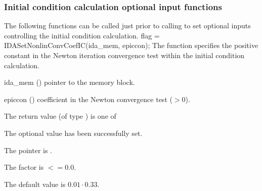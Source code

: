 {\subsubsection{Initial condition calculation optional input functions}\label{sss:optin_iccalc}
The following functions can be called just prior to calling 
to set optional inputs controlling the initial condition calculation.
{
flag = IDASetNonlinConvCoefIC(ida\_mem, epiccon);
}
{
  The function  specifies the positive constant in
  the Newton iteration convergence test within the initial condition calculation.
}
{
  \begin{args}
  \item[ida\_mem] ()
    pointer to the {\ida} memory block.
  \item[epiccon] ()
    coefficient in the Newton convergence test ($>0$).
  \end{args}
}
{
  The return value  (of type ) is one of
  \begin{args}
  \item[\Id{IDA\_SUCCESS}]
    The optional value has been successfully set.
  \item[\Id{IDA\_MEM\_NULL}]
    The  pointer is .
  \item[\Id{IDA\_ILL\_INPUT}]
    The  factor is $<= 0.0$.
  \end{args}
}
{
  The default value is $0.01 \cdot 0.33$.

}}
